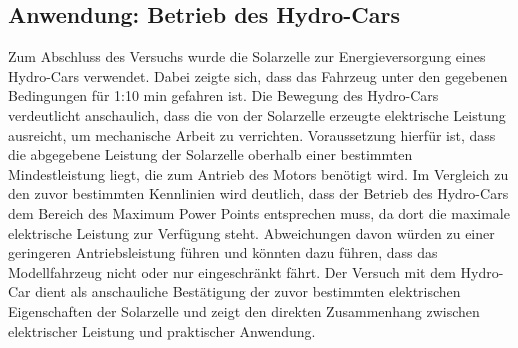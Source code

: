 \subsection{Anwendung: Betrieb des Hydro-Cars}
Zum Abschluss des Versuchs wurde die Solarzelle zur Energieversorgung eines Hydro-Cars verwendet. Dabei zeigte sich, dass das Fahrzeug unter den gegebenen Bedingungen für 1:10 min gefahren ist.
Die Bewegung des Hydro-Cars verdeutlicht anschaulich, dass die von der Solarzelle erzeugte elektrische Leistung ausreicht, um mechanische Arbeit zu verrichten. Voraussetzung hierfür ist, dass die abgegebene Leistung der Solarzelle oberhalb einer bestimmten Mindestleistung liegt, die zum Antrieb des Motors benötigt wird.
Im Vergleich zu den zuvor bestimmten Kennlinien wird deutlich, dass der Betrieb des Hydro-Cars dem Bereich des Maximum Power Points entsprechen muss, da dort die maximale elektrische Leistung zur Verfügung steht. Abweichungen davon würden zu einer geringeren Antriebsleistung führen und könnten dazu führen, dass das Modellfahrzeug nicht oder nur eingeschränkt fährt.
Der Versuch mit dem Hydro-Car dient als anschauliche Bestätigung der zuvor bestimmten elektrischen Eigenschaften der Solarzelle und zeigt den direkten Zusammenhang zwischen elektrischer Leistung und praktischer Anwendung.
\newpage